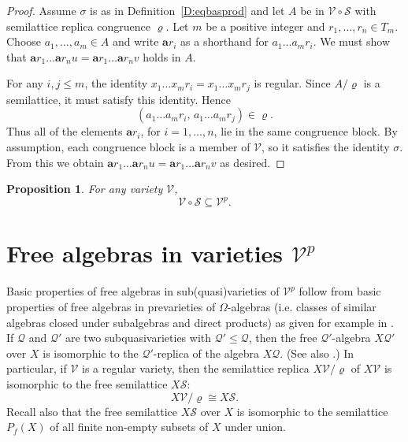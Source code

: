 \documentclass{birkau}
\def\Om{\Omega}
\newcommand{\mcV}{\mathcal{V}}
\newcommand{\mcQ}{\mathcal{Q}}
\newcommand{\mcS}{\mathcal{S}}
\newcommand{\bfa}{\mathbf a}
\newcommand{\pro}[1]{{#1}^p}
\theoremstyle{plain}
\newtheorem{proposition}[theorem]{Proposition}
\theoremstyle{definition}
\numberwithin{equation}{section}
\begin{document}
\begin{proof}
  Assume $\sigma$ is as in Definition~\ref{D:eqbasprod} and let $A$ be in
  $\mcV \circ \mcS$ with semilattice replica congruence $\varrho$. Let $m$ be a positive
  integer and $r_1,\dots, r_n \in T_m$.  Choose $a_1,\dots,a_m \in A$ and write
  $\mathbf{a} r_i $ as a shorthand for $a_1\ldots a_m r_i$. We must show that
  $\bfa r_1 \ldots \bfa r_n u = \bfa r_1 \ldots \bfa r_n v$ holds in $A$.

For any $i,j \leq m$, the identity $x_1\ldots x_m r_i = x_1\ldots x_m r_j$ is
regular. Since $A/\varrho$ is a semilattice, it must satisfy this identity. Hence
\begin{equation*}
(a_1\ldots a_m r_i,\, a_1\ldots a_m r_j) \in \varrho.
\end{equation*}
Thus all of the elements $\bfa r_i$, for $i=1,\dots,n$, lie in the same congruence
block. By assumption, each congruence block is a member of $\mcV$, so it satisfies the
identity $\sigma$. From this we obtain $\bfa r_1 \ldots \bfa r_n u = 
\bfa r_1 \ldots \bfa r_n v$ as desired.
\end{proof}


\begin{proposition}\label{P:VoS}
For any variety $\mcV$,
\begin{equation}\label{E:VSinP}
\mcV \circ \mcS \subseteq \pro{\mcV}.
\end{equation}
\end{proposition}





\section{Free algebras in varieties $\pro{\mcV}$}\label{S:free}

Basic properties of free algebras
in sub(quasi)varieties of $\pro{\mcV}$ follow from basic properties of free algebras in
prevarieties of $\Om$-algebras (i.e. classes of similar algebras closed under subalgebras
and direct products) as given for example in \cite[\S3.3]{RS02}.
If $\mcQ$ and
$\mcQ'$ are two subquasivarieties with $\mcQ' \leq \mcQ$, then the free
$\mcQ'$-algebra $X\mcQ'$ over $X$ is isomorphic to the $\mcQ'$-replica of the algebra
$X\mcQ$. (See also \cite[Thm.~4.28]{CB12}.) In particular, if $\mcV$ is a regular
variety, then the semilattice replica $X\mcV/\varrho$ of $X\mcV$ is
isomorphic to the free semilattice $X\mcS$:
\begin{equation}\label{E:freesl}
X\mcV/\varrho \cong X\mcS.
\end{equation}
Recall also that the free semilattice $X\mcS$ over $X$ is isomorphic to the semilattice
$P_{f}(X)$ of all finite non-empty subsets of $X$ under union.
\end{document}
